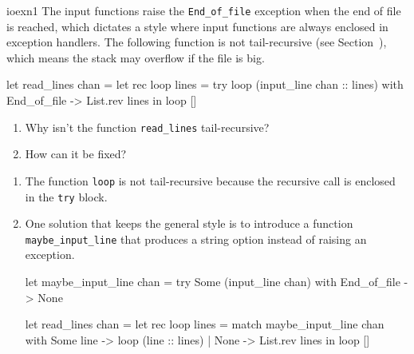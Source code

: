 %
\begin{exercise}{ioexn1}
The input functions raise the \hbox{\lstinline+End_of_file+} exception
when the end of file is reached, which dictates a style where input
functions are always enclosed in exception handlers.  The following
function is not tail-recursive (see
Section~), which means the stack may
overflow if the file is big.

\begin{ocaml}
let read_lines chan =
   let rec loop lines =
      try loop (input_line chan :: lines) with
         End_of_file -> List.rev lines
   in
   loop []
\end{ocaml}
%
\begin{enumerate}
\item Why isn't the function \lstinline$read_lines$ tail-recursive?
\item How can it be fixed?
\end{enumerate}

\begin{answer}\ifanswers
\begin{enumerate}
\item

The function \lstinline$loop$ is not tail-recursive because the
recursive call is enclosed in the \lstinline$try$ block.

\item

One solution that keeps the general style is to introduce
a function \lstinline$maybe_input_line$ that produces a string
option instead of raising an exception.

\begin{ocaml}
let maybe_input_line chan =
   try Some (input_line chan) with
      End_of_file -> None

let read_lines chan =
   let rec loop lines =
      match maybe_input_line chan with
         Some line -> loop (line :: lines)
       | None -> List.rev lines
   in
   loop []
\end{ocaml}
\end{enumerate}
\fi\end{answer}
\end{exercise}

